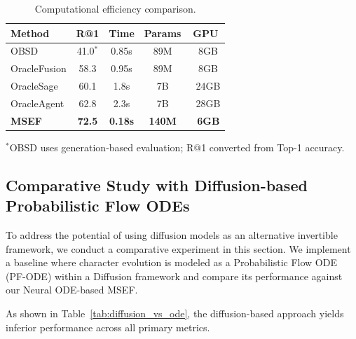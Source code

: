 \documentclass{article}
\begin{document}
\begin{table}[t]
\centering
\small
\caption{Computational efficiency comparison.}
\label{tab:efficiency}
\begin{tabular}{lcccc}
\toprule
\textbf{Method} & \textbf{R@1} & \textbf{Time} & \textbf{Params} & \textbf{GPU} \\
\midrule
OBSD & 41.0$^*$ & 0.85s & 89M & ~8GB \\
OracleFusion & 58.3 & 0.95s & 89M & ~8GB \\
OracleSage & 60.1 & 1.8s & 7B & ~24GB \\
OracleAgent & 62.8 & 2.3s & 7B & ~28GB \\
\rowcolor{gray!10}
\textbf{MSEF} & \textbf{72.5} & \textbf{0.18s} & \textbf{140M} & \textbf{~6GB} \\
\bottomrule
\end{tabular}

\scriptsize{$^*$OBSD uses generation-based evaluation; R@1 converted from Top-1 accuracy.}
\end{table}


\subsection{Comparative Study with Diffusion-based Probabilistic Flow ODEs}
\label{sec:comparative_study}

To address the potential of using diffusion models as an alternative invertible framework, we conduct a comparative experiment in this section. We implement a baseline where character evolution is modeled as a Probabilistic Flow ODE (PF-ODE) within a Diffusion framework and compare its performance against our Neural ODE-based MSEF.

As shown in Table~\ref{tab:diffusion_vs_ode}, the diffusion-based approach yields inferior performance across all primary metrics.

\begin{table}[h]
\centering
\caption{Performance comparison between Diffusion-based PF-ODE and the proposed MSEF (Neural ODE).}
\label{tab:diffusion_vs_ode}
\end{table}
\end{document}
